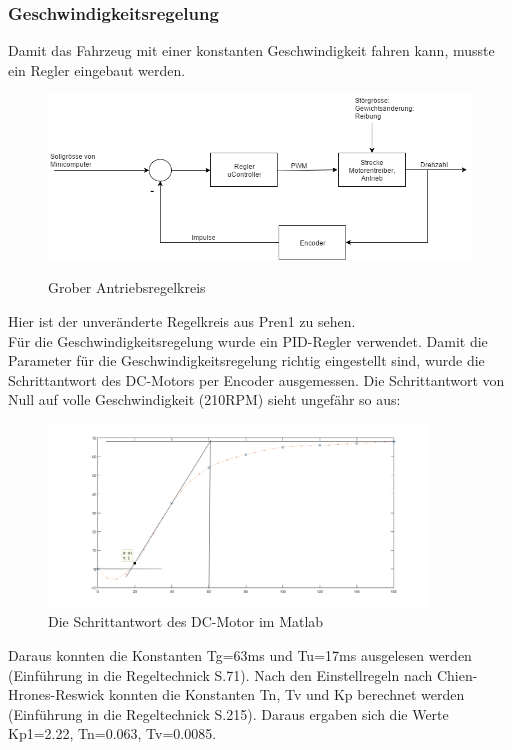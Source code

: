 \subsubsection{Geschwindigkeitsregelung}
Damit das Fahrzeug mit einer konstanten Geschwindigkeit fahren kann, musste ein Regler eingebaut werden.
\begin{figure}[H]
	\centering
	\includegraphics[width=1\textwidth]{03_Loesungskonzept/pictures/Gesch_Regelung.png}
	\label{Regelung_Gesch}
	\caption{Grober Antriebsregelkreis}
\end{figure}
Hier ist der unveränderte Regelkreis aus Pren1 zu sehen.\\Für die Geschwindigkeitsregelung wurde ein PID-Regler verwendet. Damit die Parameter für die Geschwindigkeitsregelung richtig eingestellt sind, wurde die Schrittantwort des DC-Motors per Encoder ausgemessen. Die Schrittantwort von Null auf volle Geschwindigkeit (210RPM) sieht ungefähr so aus:
\begin{figure}[H]%
\centering
\includegraphics[width=0.9\textwidth]{03_Loesungskonzept/pictures/Sprungantwort.png}
\caption{Die Schrittantwort des DC-Motor im Matlab}
\label{fig:schrittantwort}
\end{figure}
Daraus konnten die Konstanten Tg=63ms und Tu=17ms ausgelesen werden (Einführung in die Regeltechnick S.71). Nach den Einstellregeln nach Chien-Hrones-Reswick konnten die Konstanten Tn, Tv und Kp berechnet werden (Einführung in die Regeltechnick S.215). Daraus ergaben sich die Werte Kp1=2.22, Tn=0.063, Tv=0.0085.

